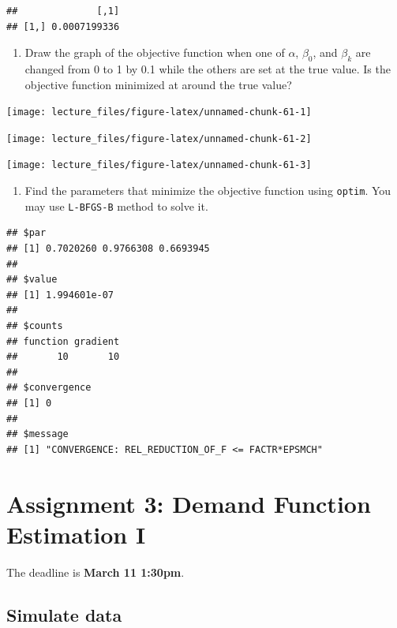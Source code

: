 \documentclass[]{book}
\providecommand{\tightlist}{%
  \setlength{\itemsep}{0pt}\setlength{\parskip}{0pt}}
\begin{document}
\begin{verbatim}
##              [,1]
## [1,] 0.0007199336
\end{verbatim}

\begin{enumerate}
\def\labelenumi{\arabic{enumi}.}
\setcounter{enumi}{7}
\tightlist
\item
  Draw the graph of the objective function when one of \(\alpha\),
  \(\beta_0\), and \(\beta_k\) are changed from 0 to 1 by 0.1 while the
  others are set at the true value. Is the objective function minimized
  at around the true value?
\end{enumerate}

\begin{center}\texttt{[image: lecture\_files/figure-latex/unnamed-chunk-61-1]} \end{center}

\begin{center}\texttt{[image: lecture\_files/figure-latex/unnamed-chunk-61-2]} \end{center}

\begin{center}\texttt{[image: lecture\_files/figure-latex/unnamed-chunk-61-3]} \end{center}

\begin{enumerate}
\def\labelenumi{\arabic{enumi}.}
\setcounter{enumi}{8}
\tightlist
\item
  Find the parameters that minimize the objective function using
  \texttt{optim}. You may use \texttt{L-BFGS-B} method to solve it.
\end{enumerate}

\begin{verbatim}
## $par
## [1] 0.7020260 0.9766308 0.6693945
## 
## $value
## [1] 1.994601e-07
## 
## $counts
## function gradient 
##       10       10 
## 
## $convergence
## [1] 0
## 
## $message
## [1] "CONVERGENCE: REL_REDUCTION_OF_F <= FACTR*EPSMCH"
\end{verbatim}

\chapter{Assignment 3: Demand Function Estimation I}\label{assignment3}

The deadline is \textbf{March 11 1:30pm}.

\section{Simulate data}\label{simulate-data-2}
\end{document}

